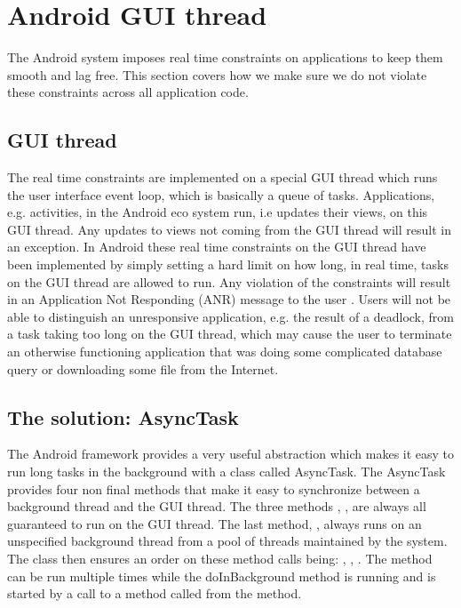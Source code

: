
\section{Android GUI thread}
\label{sec:gui_thread_async_task}

The Android system imposes real time constraints on applications to keep them smooth and lag free. This section covers how we make sure we do not violate these constraints across all application code.

\subsection{GUI thread}
The real time constraints are implemented on a special GUI thread which runs the user interface event loop, which is basically a queue of tasks. Applications, e.g. activities, in the Android eco system run, i.e updates their views, on this GUI thread. Any updates to views not coming from the GUI thread will result in an exception. In Android these real time constraints on the GUI thread have been implemented by simply setting a hard limit on how long, in real time, tasks on the GUI thread are allowed to run. Any violation of the constraints will result in an Application Not Responding (ANR) message to the user \parencite{android_avoid_anr}. Users will not be able to distinguish an unresponsive application, e.g. the result of a deadlock, from a task taking too long on the GUI thread, which may cause the user to terminate an otherwise functioning application that was doing some complicated database query or downloading some file from the Internet. 

\subsection{The solution: AsyncTask}

The Android framework provides a very useful abstraction which makes it easy to run long tasks in the background with a class called AsyncTask. The AsyncTask provides four non final methods that make it easy to synchronize between a background thread and the GUI thread. The three methods , ,  are always all guaranteed to run on the GUI thread. The last method, , always runs on an unspecified background thread from a pool of threads maintained by the system. The class then ensures an order on these method calls being: , , . The  method can be run multiple times while the doInBackground method is running and is started by a call to a method called  from the  method.  

